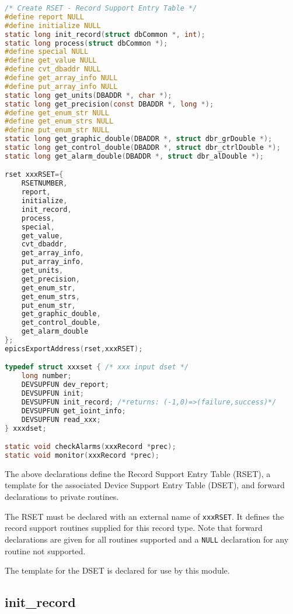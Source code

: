 \begin{lstlisting}[language=C]
/* Create RSET - Record Support Entry Table */
#define report NULL
#define initialize NULL
static long init_record(struct dbCommon *, int);
static long process(struct dbCommon *);
#define special NULL
#define get_value NULL
#define cvt_dbaddr NULL
#define get_array_info NULL
#define put_array_info NULL
static long get_units(DBADDR *, char *);
static long get_precision(const DBADDR *, long *);
#define get_enum_str NULL
#define get_enum_strs NULL
#define put_enum_str NULL
static long get_graphic_double(DBADDR *, struct dbr_grDouble *);
static long get_control_double(DBADDR *, struct dbr_ctrlDouble *);
static long get_alarm_double(DBADDR *, struct dbr_alDouble *);

rset xxxRSET={
    RSETNUMBER,
    report,
    initialize,
    init_record,
    process,
    special,
    get_value,
    cvt_dbaddr,
    get_array_info,
    put_array_info,
    get_units,
    get_precision,
    get_enum_str,
    get_enum_strs,
    put_enum_str,
    get_graphic_double,
    get_control_double,
    get_alarm_double
};
epicsExportAddress(rset,xxxRSET);

typedef struct xxxset { /* xxx input dset */
    long number;
    DEVSUPFUN dev_report;
    DEVSUPFUN init;
    DEVSUPFUN init_record; /*returns: (-1,0)=>(failure,success)*/
    DEVSUPFUN get_ioint_info;
    DEVSUPFUN read_xxx;
} xxxdset;

static void checkAlarms(xxxRecord *prec);
static void monitor(xxxRecord *prec);
\end{lstlisting}

The above declarations define the Record Support Entry Table (RSET), a template for the associated Device Support Entry Table (DSET), and forward declarations to private routines.

The RSET must be declared with an external name of \verb|xxxRSET|. It defines the record support routines supplied for this record type.
Note that forward declarations are given for all routines supported and a \verb|NULL| declaration for any routine not supported.

The template for the DSET is declared for use by this module.

\subsection{init\_record}

